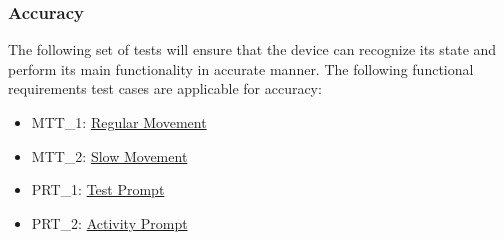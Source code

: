 \documentclass[12pt, titlepage]{article}
\begin{document}
\subsubsection{Accuracy}
The following set of tests will ensure that the device can recognize its state and perform its main functionality in accurate manner.
The following functional requirements test cases are applicable for accuracy:

\begin{itemize}
\item MTT\_1: \hyperref[MTT1]{Regular Movement}
\item MTT\_2: \hyperref[MTT2]{Slow Movement}
\item PRT\_1: \hyperref[PRT1]{Test Prompt}
\item PRT\_2: \hyperref[PRT2]{Activity Prompt}
\end{itemize}
\end{document}
